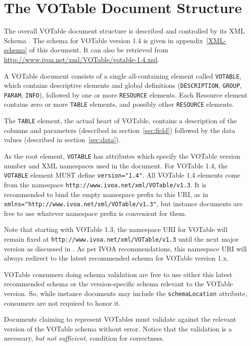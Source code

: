 \documentclass[11pt,a4paper]{ivoa}
\def\Aref#1{section~\ref{#1}}
\def\Arefx#1{appendix~\ref{#1}}
\let\fg=\color
\def\attr#1{{\tt{\fg{DarkRed}#1}}}
\def\elem#1{{\tt{\fg{DarkRed}#1}}}
\def\attrval#1#2{{\tt{\fg{DarkRed}#1}="{\fg{DarkPurple}#2}"}}
\begin{document}
\section{The VOTable Document Structure}
\label{elem:VOTABLE}

The overall VOTable document structure is described and controlled
by its XML Schema \citep{std:XSD}.  The schema for VOTable version 1.4 is
given in \Arefx{XML-schema} of this document.  It can also
be retrieved from \url{http://www.ivoa.net/xml/VOTable/votable-1.4.xsd}.

A VOTable document consists of a single all-containing element
called {\elem{VOTABLE}}, which contains descriptive elements and global definitions
({\elem{DESCRIPTION}}, \elem{GROUP}, \elem{PARAM}, \elem{INFO}),
followed by one or more {\elem{RESOURCE}} elements.
Each Resource element contains zero or more \elem{TABLE} elements,
and possibly other \elem{RESOURCE} elements.

The \elem{TABLE} element, the actual heart of VOTable, contains
a description of the columns and parameters
(described in \Aref{sec:field})
followed by the data values
(described in \Aref{sec:data}).

As the root element, \elem{VOTABLE} has attributes which specify the VOTable version
number and XML namespaces used in the document. For VOTable 1.4, the \elem{VOTABLE}
element MUST define \attrval{version}{1.4}.  All VOTable 1.4 elements come from the
namespace \nolinkurl{http://www.ivoa.net/xml/VOTable/v1.3}.  It is recommended to bind
the empty namespace prefix to this URI, as in
\attrval{xmlns}{http://www.ivoa.net/xml/VOTable/v1.3}, but instance
documents are free to use whatever namespace prefix is convenient for them.

Note that starting with VOTable 1.3, the namespace URI for VOTable will
remain fixed at \nolinkurl{http://www.ivoa.net/xml/VOTable/v1.3}
until the next major version as discussed in \citet{2018ivoa.spec.0529H}.
As per IVOA
recommendations, this namespace URI will always redirect to the latest
recommended schema for VOTable version 1.x.

VOTable consumers doing schema validation
are free to use either this latest recommended schema or the version-specific
schema relevant to the VOTable version. So, while instance documents
may include the \attr{schemaLocation} attribute, consumers are not required
to honor it.

Documents claiming to represent VOTables must validate against the
relevant version of the VOTable schema without error.  Notice that the
validation is a necessary, {\em but not sufficient}, condition for correctness.
\end{document}
